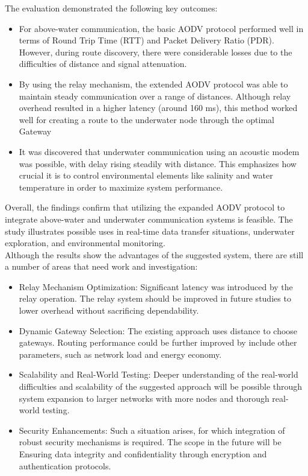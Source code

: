 \documentclass[]{nsm-thesis}
\begin{document}
The evaluation demonstrated the following key outcomes:
\begin{itemize}
    \item For above-water communication, the basic AODV protocol performed well in terms of Round Trip Time (RTT) and Packet Delivery Ratio (PDR). However, during route discovery, there were considerable losses due to the difficulties of distance and signal attenuation.
    \item By using the relay mechanism, the extended AODV protocol was able to maintain steady communication over a range of distances. Although relay overhead resulted in a higher latency (around 160 ms), this method worked well for creating a route to the underwater node through the optimal Gateway
    \item It was discovered that underwater communication using an acoustic modem was possible, with delay rising steadily with distance. This emphasizes how crucial it is to control environmental elements like salinity and water temperature in order to maximize system performance.
    
\end{itemize}
Overall, the findings confirm that utilizing the expanded AODV protocol to integrate above-water and underwater communication systems is feasible. The study illustrates possible uses in real-time data transfer situations, underwater exploration, and environmental monitoring.\\
\clearpage
Although the results show the advantages of the suggested system, there are still a number of areas that need work and investigation:
\begin{itemize}
    \item Relay Mechanism Optimization: Significant latency was introduced by the relay operation. The relay system should be improved in future studies to lower overhead without sacrificing dependability.
    \item Dynamic Gateway Selection: The existing approach uses distance to choose gateways. Routing performance could be further improved by include other parameters, such as network load and energy economy.
    \item Scalability and Real-World Testing: Deeper understanding of the real-world difficulties and scalability of the suggested approach will be possible through system expansion to larger networks with more nodes and thorough real-world testing.
    \item Security Enhancements: Such a situation arises, for which integration of robust security mechanisms is required. The scope in the future will be Ensuring data integrity and confidentiality through encryption and authentication protocols.
           
\end{itemize}
\appendix
\end{document}
